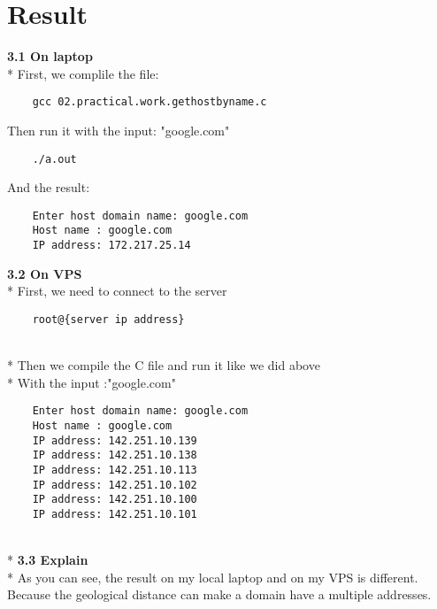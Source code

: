 \documentclass{article}
\begin{document}
\section{Result}
\textbf{3.1 On laptop}
\\*
First, we complile the file:
\begin{verbatim}
    gcc 02.practical.work.gethostbyname.c
\end{verbatim}
Then run it with the input: "google.com"
\begin{verbatim}
    ./a.out
\end{verbatim}
And the result:
\begin{verbatim}
    Enter host domain name: google.com
    Host name : google.com 
    IP address: 172.217.25.14 
\end{verbatim}

\textbf{3.2 On VPS}
\\*
First, we need to connect to the server
\begin{verbatim}
    root@{server ip address}
\end{verbatim}
\\*
Then we compile the C file and run it like we did above
\\*
With the input :"google.com"
\begin{verbatim}
    Enter host domain name: google.com
    Host name : google.com 
    IP address: 142.251.10.139 
    IP address: 142.251.10.138 
    IP address: 142.251.10.113 
    IP address: 142.251.10.102 
    IP address: 142.251.10.100 
    IP address: 142.251.10.101
\end{verbatim}
\\*
\textbf{3.3 Explain}
\\*
As you can see, the result on my local laptop and on my VPS is different. Because the geological distance can make a domain have a multiple addresses.
\end{document}
